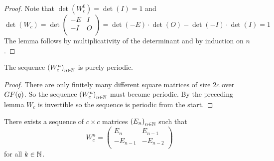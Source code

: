 \begin{proof}
  Note that $\det(W_{c}^{0}) = \det(I) = 1$ and
  \[
  \det(W_{c}) = \det
  \left(
  \begin{array}{cc}
    -E & I \\
    -I & O \\
  \end{array}
  \right)
  =
  \det(-E) \cdot \det(O) - \det(-I) \cdot \det(I)
  =
  1
  \]
  The lemma follows by multiplicativity of the determinant and
  by induction on $n$.
\end{proof}

\begin{theorem}
  The sequence $\left(W_{c}^{n}\right)_{n\in\mathbb{N}}$ is purely periodic.
\end{theorem}

\begin{proof}
  There are only finitely many different square matrices of size $2c$ over
  $GF(q)$. So the sequence $\left(W_{c}^{n}\right)_{n\in\mathbb{N}}$ must
  become periodic. By the preceding lemma $W_{c}$ is invertible so the
  sequence is periodic from the start.
\end{proof}

\begin{lemma}[$W$-structure]
  There exists a sequence of $c \times c$ matrices
  $\left(E_{n}\right)_{n\in\mathbb{N}}$ such that
  \[
  W_{c}^{n}
  =
  \left(
  \begin{array}{cc}
     E_{n} &  E_{n-1} \\
    -E_{n-1} & -E_{n-2}   \\
  \end{array}
  \right)
  \]
  for all $k\in\mathbb{N}$.
\end{lemma}

